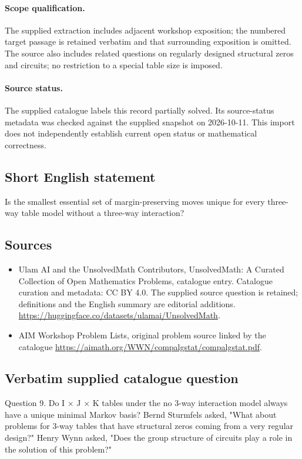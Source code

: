 \documentclass[11pt]{article}
\begin{document}
\paragraph{Scope qualification.}
The supplied extraction includes adjacent workshop exposition; the numbered target passage is retained verbatim and that surrounding exposition is omitted. The source also includes related questions on regularly designed structural zeros and circuits; no restriction to a special table size is imposed.
\paragraph{Source status.}
The supplied catalogue labels this record partially solved. Its source-status metadata was checked against the supplied snapshot on 2026-10-11. This import does not independently establish current open status or mathematical correctness.
\subsection{Short English statement}
Is the smallest essential set of margin-preserving moves unique for every three-way table model without a three-way interaction?
\subsection{Sources}
\begin{itemize}
\item[S1] Ulam AI and the UnsolvedMath Contributors, UnsolvedMath: A Curated Collection of Open Mathematics Problems, catalogue entry. Catalogue curation and metadata: CC BY 4.0. The supplied source question is retained; definitions and the English summary are editorial additions.
\url{https://huggingface.co/datasets/ulamai/UnsolvedMath}.
\item[S2] AIM Workshop Problem Lists, original problem source linked by the catalogue
\url{https://aimath.org/WWN/compalgstat/compalgstat.pdf}.
\end{itemize}
\subsection{Verbatim supplied catalogue question}
Question 9. Do I × J × K tables under the no 3-way interaction model always have a unique minimal Markov basis? Bernd Sturmfels asked, "What about problems for 3-way tables that have structural zeros coming from a very regular design?" Henry Wynn asked, "Does the group structure of circuits play a role in the solution of this problem?"
\end{document}
